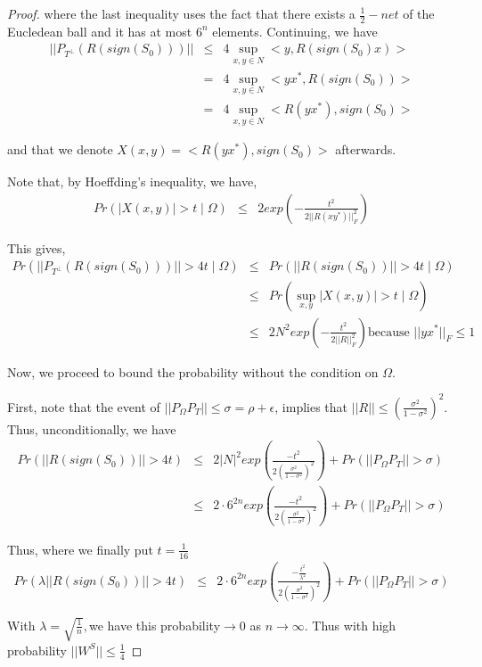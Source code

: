 \documentclass{../common/projectreport}
\begin{document}
\begin{proof}
where the last inequality uses the fact that there exists a $\frac{1}{2}-net$ of the Eucledean ball and it has at most $6^{n}$ elements. Continuing, we have 
\begin{eqnarray*}
||P_{T^{\bot}}(R(sign(S_{0})))|| & \le & 4\sup_{x,y\in N}<y,R(sign(S_{0})x)>\\
 & = & 4\sup_{x,y\in N}<yx^{*},R(sign(S_{0}))>\\
 & = & 4\sup_{x,y\in N}<R(yx^{*}),sign(S_{0})>
\end{eqnarray*}


and that we denote $X(x,y)=<R(yx^{*}),sign(S_{0})>$ afterwards.

Note that, by Hoeffding's inequality, we have, 
\begin{eqnarray*}
Pr(|X(x,y)|>t\mid\Omega) & \le & 2exp(-\frac{t^{2}}{2||R(xy^{*})||_{F}^{2}})
\end{eqnarray*}


This gives, 
\begin{eqnarray*}
Pr(||P_{T^{\bot}}(R(sign(S_{0})))||>4t\mid\Omega) & \le & Pr(||R(sign(S_{0}))||>4t\mid\Omega)\\
 & \le & Pr(\sup_{x,y}|X(x,y)|>t\mid\Omega)\\
 & \le & 2N^{2}exp(-\frac{t^{2}}{2||R||_{F}^{2}})\text{because }||yx^{*}||_{F}\le1
\end{eqnarray*}


Now, we proceed to bound the probability without the condition on $\Omega$. 

First, note that the event of $||P_{\Omega}P_{T}||\le\sigma=\rho+\epsilon$, implies that $||R||\le(\frac{\sigma^{2}}{1-\sigma^{2}})^{2}$. Thus, unconditionally, we have 
\begin{eqnarray*}
Pr(||R(sign(S_{0}))||>4t) & \le & 2|N|^{2}exp(\frac{-t^{2}}{2(\frac{\sigma^{2}}{1-\sigma^{2}})^{2}})+Pr(||P_{\Omega}P_{T}||>\sigma)\\
 & \le & 2\cdot6^{2n}exp(\frac{-t^{2}}{2(\frac{\sigma^{2}}{1-\sigma^{2}})^{2}})+Pr(||P_{\Omega}P_{T}||>\sigma)
\end{eqnarray*}


Thus, where we finally put $t=\frac{1}{16}$ 
\begin{eqnarray*}
Pr(\lambda||R(sign(S_{0}))||>4t) & \le & 2\cdot6^{2n}exp(\frac{-\frac{t^{2}}{\lambda^{2}}}{2(\frac{\sigma^{2}}{1-\sigma^{2}})^{2}})+Pr(||P_{\Omega}P_{T}||>\sigma)
\end{eqnarray*}


With $\lambda=\sqrt{\frac{1}{n}},$we have this probability$\to0$ as $n\to\infty$. Thus with high probability $||W^{S}||\le\frac{1}{4}$


\end{proof}
\end{document}
